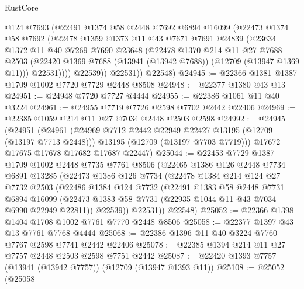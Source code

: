 \begin{lexlean}{RustCore}
\begin{coremodule}
            @124
            @7693
            (@22491
              @1374
              @58
              @2448
              @7692
              @6894
              @16099
              (@22473
                @1374
                @58
                @7692
                (@22478
                  @1359
                  @1373
                  @11
                  @43
                  @7671
                  @7691
                  @24839
                  (@23634
                    @1372
                    @11
                    @40
                    @7269
                    @7690
                    @23648
                    (@22478
                      @1370
                      @214
                      @11
                      @27
                      @7688
                      @2503
                      (@22420 @1369 @7688 (@13941 (@13942 @7688)) (@12709 (@13947 @1369 @11)))
                      @22531))))
              @22539))
          @22531))
      @22548)
@24945 := @22366 @1381 @1387 @1709 @1002 @7720 @7729 @2448 @8508
@24948 := @22377 @1380 @43 @13
@24951 := @24948 @7720 @7727 @4444
@24955 := @22386 @1061 @11 @40 @3224
@24961 := @24955 @7719 @7726 @2598 @7702 @2442 @22406
@24969 := @22385 @1059 @214 @11 @27 @7034 @2448 @2503 @2598
@24992 := @24945
    (@24951
      (@24961
        (@24969 @7712 @2442 @22949 @22427 @13195 (@12709 (@13197 @7713 @2448)))
        @13195
        (@12709 (@13197 @7703 @7719)))
      @17672
      @17675
      @17678
      @17682
      @17687
      @22447)
@25044 := @22453
    @7729
    @1387
    @1709
    @1002
    @2448
    @7735
    @7761
    @8506
    (@22465
      @1386
      @126
      @2448
      @7734
      @6891
      @13285
      (@22473
        @1386
        @126
        @7734
        (@22478
          @1384
          @214
          @124
          @27
          @7732
          @2503
          (@22486
            @1384
            @124
            @7732
            (@22491
              @1383
              @58
              @2448
              @7731
              @6894
              @16099
              (@22473 @1383 @58 @7731 (@22935 @1044 @11 @43 @7034 @6990 @22949 @22811))
              @22539))
          @22531))
      @22548)
@25052 := @22366 @1398 @1404 @1708 @1002 @7761 @7770 @2448 @8506
@25058 := @22377 @1397 @43 @13 @7761 @7768 @4444
@25068 := @22386 @1396 @11 @40 @3224 @7760 @7767 @2598 @7741 @2442 @22406
@25078 := @22385 @1394 @214 @11 @27 @7757 @2448 @2503 @2598 @7751 @2442
@25087 := @22420 @1393 @7757 (@13941 (@13942 @7757)) (@12709 (@13947 @1393 @11))
@25108 := @25052
    (@25058

\end{coremodule}
\end{lexlean}
